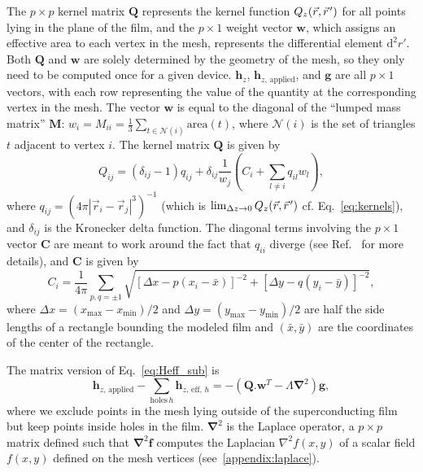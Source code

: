 \documentclass[final,3p,times,twocolumn]{elsarticle}
\newcommand{\pvec}[1]{\vec{#1}\mkern2mu\vphantom{#1}}
\newcounter{bla}
\begin{document}
The $p\times p$ kernel matrix $\mathbf{Q}$ represents the kernel function $Q_z(\vec{r},\pvec{r}')$ for all points lying in the plane of the film, and the $p\times 1$ weight vector $\mathbf{w}$, which assigns an effective area to each vertex in the mesh, represents the differential element $\mathrm{d}^2r'$. Both $\mathbf{Q}$ and $\mathbf{w}$ are solely determined by the geometry of the mesh, so they only need to be computed once for a given device. $\mathbf{h}_z$, $\mathbf{h}_{z,\,\mathrm{applied}}$, and $\mathbf{g}$ are all $p\times 1$ vectors, with each row representing the value of the quantity at the
corresponding vertex in the mesh. The vector $\mathbf{w}$ is equal to the diagonal of the ``lumped mass matrix'' $\mathbf{M}$: $w_i=M_{ii} = \frac{1}{3}\sum_{t\in\mathcal{N}(i)}\mathrm{area}(t)$,
where $\mathcal{N}(i)$ is the set of triangles $t$ adjacent to vertex $i$. The kernel matrix $\mathbf{Q}$ is given by
\begin{equation}
    \label{eq:kernel_matrix}
    Q_{ij} = (\delta_{ij}-1)q_{ij}
    + \delta_{ij}\frac{1}{w_{j}}\left(C_i + \sum_{l\neq i}q_{il}w_{l}\right),
\end{equation}
where $q_{ij} = \left(4\pi|\vec{r}_i-\vec{r}_j|^3\right)^{-1}$
(which is $\lim_{\Delta z\to 0}Q_z(\vec{r},\pvec{r}')$ cf. Eq.~\ref{eq:kernels}),
and $\delta_{ij}$ is the Kronecker delta function. The diagonal terms involving the $p\times 1$ vector $\mathbf{C}$ are meant to work around the fact that $q_{ii}$ diverge (see Ref.~\cite{Brandt2005-wj} for more details), and $\mathbf{C}$ is given by
\begin{equation}
    \label{eq:C_vector}
    C_i = \frac{1}{4\pi}\sum_{p,q=\pm1}\sqrt{[\Delta x - p(x_i-\bar{x})]^{-2} + [\Delta y - q(y_i-\bar{y})]^{-2}},
\end{equation}
where $\Delta x=(x_\mathrm{max}-x_\mathrm{min})/2$ and $\Delta y=(y_\mathrm{max}-y_\mathrm{min})/2$ are half the side lengths of a rectangle bounding the modeled film and $(\bar{x}, \bar{y})$ are the coordinates of the center of the rectangle.

The matrix version of Eq.~\ref{eq:Heff_sub} is
\begin{equation}
    \label{eq:Heff_sub_num}
     \mathbf{h}_{z,\,\mathrm{applied}} - \sum_{\mathrm{holes}\, h}\mathbf{h}_{z,\,\mathrm{eff},\,h} = -(\mathbf{Q}.\mathbf{w}^T-\Lambda\mathbf{\nabla}^2)\mathbf{g},
\end{equation}
where we exclude points in the mesh lying outside of the superconducting film but keep points
inside holes in the film. $\mathbf{\nabla}^2$
is the Laplace operator, a $p\times p$ matrix defined such that $\mathbf{\nabla}^2\mathbf{f}$ computes the Laplacian $\nabla^2f(x,y)$ of a scalar field $f(x,y)$ defined on the mesh vertices (see~\ref{appendix:laplace}).
\end{document}
